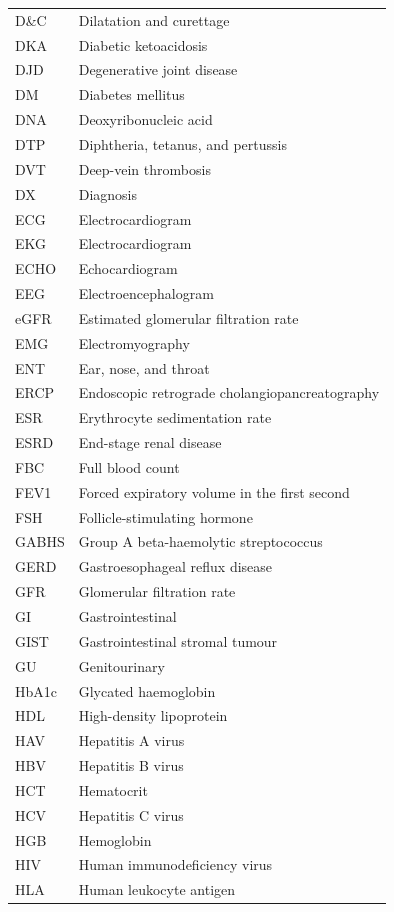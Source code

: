 \begin{longtable}{>{\raggedright\arraybackslash}p{} >{\raggedright\arraybackslash}p{}}
D\&C & Dilatation and curettage \\
DKA & Diabetic ketoacidosis \\
DJD & Degenerative joint disease \\
DM & Diabetes mellitus \\
DNA & Deoxyribonucleic acid \\
DTP & Diphtheria, tetanus, and pertussis \\
DVT & Deep-vein thrombosis \\
DX & Diagnosis \\
ECG & Electrocardiogram \\
EKG & Electrocardiogram \\
ECHO & Echocardiogram \\
EEG & Electroencephalogram \\
eGFR & Estimated glomerular filtration rate \\
EMG & Electromyography \\
ENT & Ear, nose, and throat \\
ERCP & Endoscopic retrograde cholangiopancreatography \\
ESR & Erythrocyte sedimentation rate \\
ESRD & End-stage renal disease \\
FBC & Full blood count \\
FEV1 & Forced expiratory volume in the first second \\
FSH & Follicle-stimulating hormone \\
GABHS & Group A beta-haemolytic streptococcus \\
GERD & Gastroesophageal reflux disease \\
GFR & Glomerular filtration rate \\
GI & Gastrointestinal \\
GIST & Gastrointestinal stromal tumour \\
GU & Genitourinary \\
HbA1c & Glycated haemoglobin \\
HDL & High-density lipoprotein \\
HAV & Hepatitis A virus \\
HBV & Hepatitis B virus \\
HCT & Hematocrit \\
HCV & Hepatitis C virus \\
HGB & Hemoglobin \\
HIV & Human immunodeficiency virus \\
HLA & Human leukocyte antigen \\

\end{longtable}
